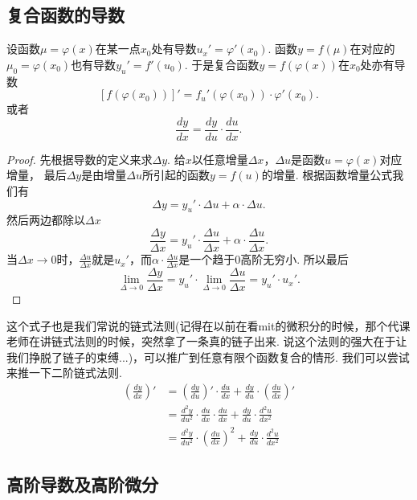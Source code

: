 \documentclass{article}
\begin{document}
\subsection{复合函数的导数}

设函数$ \mu = \varphi(x)$在某一点$x_0$处有导数$u_x' = \varphi'(x_0)$. 函数$y=f(\mu)$在对应的$\mu_0 = \varphi(x_0)$也有导数$y_u'=f'(u_0)$. 于是复合函数$y = f(\varphi(x))$在$x_0$处亦有导数\[[f(\varphi(x_0))]' =  f_u'(\varphi(x_0))\cdot\varphi'(x_0).\]或者\[\frac{dy}{dx} = \frac{dy}{du}\cdot\frac{du}{dx}.\]

\begin{proof}
先根据导数的定义来求$\Delta y $. 给$x$以任意增量$\Delta x$，$\Delta u$是函数$u = \varphi(x)$对应增量， 最后$\Delta y$是由增量$\Delta u$所引起的函数$y = f(u)$的增量. 根据函数增量公式我们有\[\Delta y = y_u' \cdot \Delta u + \alpha \cdot \Delta u.\]然后两边都除以$\Delta x$ \[\frac{\Delta y}{\Delta x} = y_u' \cdot \frac{\Delta u}{\Delta x} + \alpha \cdot \frac{\Delta u}{\Delta x}. \]当$\Delta x \rightarrow 0$时，$\frac{\Delta u}{\Delta x}$就是$u_x'$，而$\alpha \cdot \frac{\Delta u}{\Delta x}$是一个趋于$0$高阶无穷小. 所以最后\[\lim\limits_{\Delta \rightarrow 0} \frac{\Delta y}{\Delta x} = y_u' \cdot \lim\limits_{\Delta \rightarrow 0} \frac{\Delta u}{\Delta x} = y_u' \cdot u_x'. \]
\end{proof}


这个式子也是我们常说的链式法则(记得在以前在看mit的微积分的时候，那个代课老师在讲链式法则的时候，突然拿了一条真的链子出来. 说这个法则的强大在于让我们挣脱了链子的束缚...)，可以推广到任意有限个函数复合的情形. 我们可以尝试来推一下二阶链式法则.
\begin{equation}
\begin{aligned}
\left(\frac{dy}{dx}\right)' &= \left( \frac{dy}{du} \right)' \cdot \frac{du}{dx} + \frac{dy}{du} \cdot \left( \frac{du}{dx} \right)' \\
&= \frac{d^2y}{du^2} \cdot \frac{du}{dx} \cdot \frac{du}{dx} + \frac{dy}{du} \cdot \frac{d^2u}{dx^2} \\
&= \frac{d^2y}{du^2} \cdot \left( \frac{du}{dx} \right) ^2 + \frac{dy}{du} \cdot \frac{d^2u}{dx^2}
\end{aligned}
\end{equation}


\newpage
\subsection{高阶导数及高阶微分}
\end{document}
